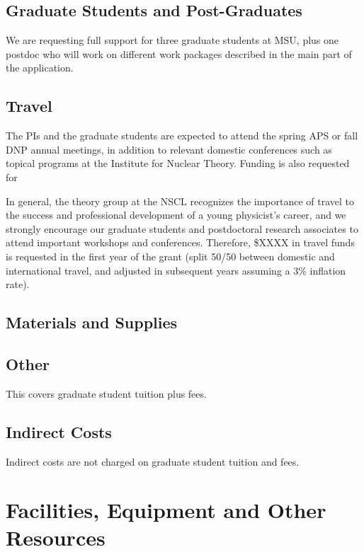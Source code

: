 \documentclass[10pt]{article}
\begin{document}
\subsection{Graduate Students and Post-Graduates} 

We are requesting full support for three graduate  students at
MSU, plus one postdoc who will work on different work packages described in the main part of the application. 






\subsection{Travel}

The PIs and the graduate students are expected to attend the spring
APS or fall DNP annual meetings, in addition to relevant domestic
conferences such as topical programs at the Institute for Nuclear
Theory. Funding is also requested for

In general, the theory group at the NSCL recognizes the importance of
travel to the success and professional development of a young
physicist's career, and we strongly encourage our graduate students
and postdoctoral research associates to attend important workshops and
conferences.  Therefore, \$XXXX in travel funds is requested in the
first year of the grant (split 50/50 between domestic and
international travel, and adjusted in subsequent years assuming a 3\%
inflation rate).

\subsection{Materials and Supplies}

\subsection{Other}
This covers graduate student tuition plus fees.

\subsection{Indirect Costs}

Indirect costs are not charged on graduate student tuition and fees.







\section{Facilities, Equipment and Other Resources}
\end{document}
